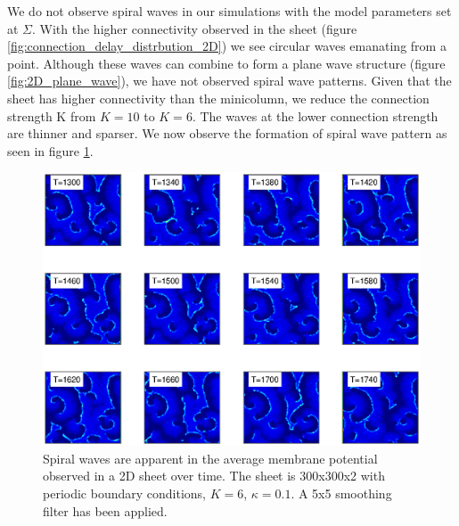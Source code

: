 We do not observe spiral waves in our simulations with the model parameters set at $\Sigma$.
With the higher connectivity observed in the sheet (figure \ref{fig:connection_delay_distrbution_2D}) we see circular waves emanating from a point.
Although these waves can combine to form a plane wave structure (figure \ref{fig:2D_plane_wave}), we have not observed spiral wave patterns.
Given that the sheet has higher connectivity than the minicolumn, we reduce the connection strength K from $K=10$ to $K=6$.
The waves at the lower connection strength are thinner and sparser.
We now observe the formation of spiral wave pattern as seen in figure \ref{fig:2DSpiralWaves}.
\begin{figure}[!htb]
 \caption{ Spiral waves are apparent in the average membrane potential observed in a 2D sheet over time. 
           The sheet is 300x300x2 with periodic boundary conditions, $K=6$, $\kappa=0.1$.
           A 5x5 smoothing filter has been applied. }
 \label{fig:2DSpiralWaves}
 \centering
   \includegraphics[width=\textwidth]{fig/SpiralWaves2D_K6_kappa0p1_M4}
\end{figure}
\FloatBarrier

